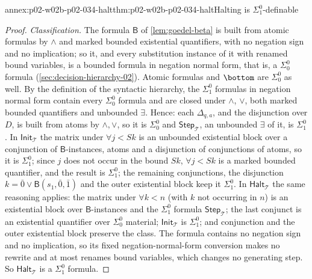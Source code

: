\begin{annexitem}{annex:p02-w02b-p02-034-halt}{thm:p02-w02b-p02-034-halt}{Halting is \(\Sigma^0_1\)-definable}
\begin{proof}
\emph{Classification.}  The formula \(\mathsf B\) of \cref{lem:goedel-beta}
is built from atomic formulas by \(\land\) and marked bounded existential
quantifiers, with no negation sign and no implication; so it, and every
substitution instance of it with renamed bound variables, is a bounded
formula in negation normal form, that is, a \(\Sigma^0_0\) formula
(\cref{sec:decision-hierarchy-02}).  Atomic formulas and \(\bottom\) are
\(\Sigma^0_0\) as well.  By the definition of the syntactic hierarchy, the
\(\Sigma^0_1\) formulas in negation normal form contain every
\(\Sigma^0_0\) formula and are closed under \(\land\), \(\lor\), both marked
bounded quantifiers and unbounded \(\exists\).  Hence:
each \(\Delta_{q,a}\), and the disjunction over \(D\), is built from atoms by
\(\land,\lor\), so it is \(\Sigma^0_0\) and \(\mathsf{Step}_{\mathcal T}\),
an unbounded \(\exists\) of it, is \(\Sigma^0_1\).  In
\(\mathsf{Init}_{\mathcal T}\) the matrix under \(\forall j<Sk\) is an
unbounded existential block over a conjunction of \(\mathsf B\)-instances,
atoms and a disjunction of conjunctions of atoms, so it is \(\Sigma^0_1\);
since \(j\) does not occur in the bound \(Sk\), \(\forall j<Sk\) is a marked
bounded quantifier, and the result is \(\Sigma^0_1\); the remaining
conjunctions, the disjunction \(k=\bar0\lor\mathsf B(s_1,\bar0,\bar1)\) and the
outer existential block keep it \(\Sigma^0_1\).  In
\(\mathsf{Halt}_{\mathcal T}\) the same reasoning applies: the matrix under
\(\forall k<n\) (with \(k\) not occurring in \(n\)) is an existential block
over \(\mathsf B\)-instances and the \(\Sigma^0_1\) formula
\(\mathsf{Step}_{\mathcal T}\); the last conjunct is an existential
quantifier over \(\Sigma^0_0\) material; \(\mathsf{Init}_{\mathcal T}\) is
\(\Sigma^0_1\); and conjunction and the outer existential block preserve the
class.  The formula contains no negation sign and no implication, so its
fixed negation-normal-form conversion makes no rewrite and at most renames
bound variables, which changes no generating step.  So
\(\mathsf{Halt}_{\mathcal T}\) is a \(\Sigma^0_1\) formula.


\end{proof}
\end{annexitem}
